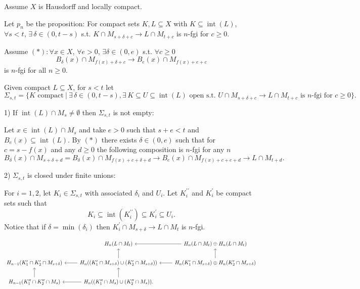 \documentclass{amsart}
\theoremstyle{definition}
\newcommand{\dprime}{{\prime\prime}}
\DeclareMathOperator{\interior}{int}
\begin{document}
\newpage

Assume $X$ is Hausdorff and locally compact.

Let $p_n$ be the proposition: For compact sets $K, L \subseteq X$ with $K \subseteq \interior(L)$, $\forall s < t$, $\exists\, \delta \in (0, t-s)$ s.t. $K \cap M_{s+\delta+c} \to L \cap M_{t+c}$ is $n$-fgi for $c \geq 0$.

Assume $(\ast): \forall x \in X$, $\forall e > 0$, $\exists \delta \in (0,e)$ s.t. $\forall c \geq 0$
\begin{equation*}
B_\delta(x) \cap M_{f(x)+\delta+c} \to B_e(x) \cap M_{f(x)+e+c}
\end{equation*} 
is $n$-fgi for all $n \geq 0$.

Given compact $L \subseteq X$, for $s < t$ let
\begin{equation*}
\Sigma_{s,t} = \{K \text{ compact}\ |\ \exists\, \delta \in (0, t-s), \exists\, K \subseteq U \subseteq \interior(L) \text{ open s.t. } U \cap M_{s+\delta+c} \to L \cap M_{t+c} \text{ is $n$-fgi for } c\geq 0\}.
\end{equation*}

1) If $\interior(L) \cap M_s \neq \emptyset$ then $\Sigma_{s, t}$ is not empty:

Let $x \in \interior(L) \cap M_{s}$ and take $e > 0$ such that $s + e < t$ and $B_e(x) \subseteq \interior(L)$.
By $(\ast)$ there exists $\delta \in (0, e)$ such that for $c = s - f(x)$ and any $d \geq 0$ the following composition is $n$-fgi for any $n$
\begin{equation*}
B_\delta(x) \cap M_{s + \delta + d} =
B_\delta(x) \cap M_{f(x) + c + \delta + d} \to
B_e(x) \cap M_{f(x) + c + e + d} \to
L \cap M_{t + d}.
\end{equation*}  

2) $\Sigma_{s,t}$ is closed under finite unions:

For $i = 1, 2$, let $K_i \in \Sigma_{s,t}$ with associated $\delta_i$ and $U_i$. Let $K_i^\dprime$ and $K_i^\prime$ be compact sets such that
\begin{equation*}
K_i \subseteq \interior(K_i^\dprime) \subseteq K_i^\prime \subseteq U_i.
\end{equation*}
Notice that if $\delta = \min(\delta_i)$ then $K_i^\prime \cap M_{s+\delta} \to L \cap M_t$ is $n$-fgi.

\begin{equation*}
\begin{tikzcd}
& H_n(L \cap M_t) & \arrow[l] H_n(L \cap M_t) \oplus H_n(L \cap M_t) \\
H_{n-1}(K_1^\prime \cap K_2^\prime \cap M_{s+\delta}) & 
H_{n}((K_1^\prime \cap M_{s+\delta}) \cup (K_2^\prime \cap M_{s+\delta})) \arrow[l] \arrow[u] &
H_{n}(K_1^\prime \cap M_{s+\delta}) \oplus H_n(K_2^\prime \cap M_{s+\delta}) \arrow[l] \arrow[u] \\
H_{n-1}(K_1^\dprime \cap K_2^\dprime \cap M_s) \arrow[u] & 
H_{n}((K_1^\dprime \cap M_s) \cup (K_2^\dprime \cap M_s)) \arrow[l] \arrow[u]. &
\end{tikzcd}
\end{equation*}
\end{document}
